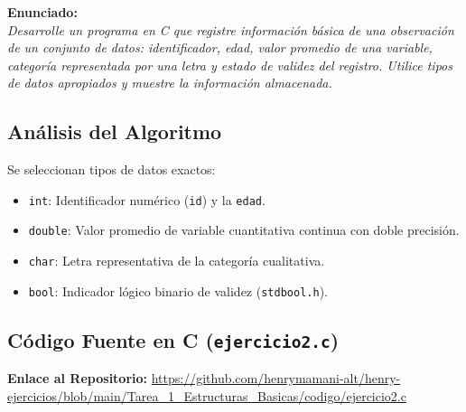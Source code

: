 \documentclass[12pt]{article}
\begin{document}
\noindent\textbf{Enunciado:}\\
\textit{Desarrolle un programa en C que registre información básica de una observación de un conjunto de datos: identificador, edad, valor promedio de una variable, categoría representada por una letra y estado de validez del registro. Utilice tipos de datos apropiados y muestre la información almacenada.}

\subsection*{Análisis del Algoritmo}
Se seleccionan tipos de datos exactos:
\begin{itemize}
    \item \texttt{int}: Identificador numérico (\texttt{id}) y la \texttt{edad}.
    \item \texttt{double}: Valor promedio de variable cuantitativa continua con doble precisión.
    \item \texttt{char}: Letra representativa de la categoría cualitativa.
    \item \texttt{bool}: Indicador lógico binario de validez (\texttt{stdbool.h}).
\end{itemize}

\subsection*{Código Fuente en C (\texttt{ejercicio2.c})}
\noindent\textbf{Enlace al Repositorio:} \url{https://github.com/henrymamani-alt/henry-ejercicios/blob/main/Tarea_1_Estructuras_Basicas/codigo/ejercicio2.c}
\end{document}
